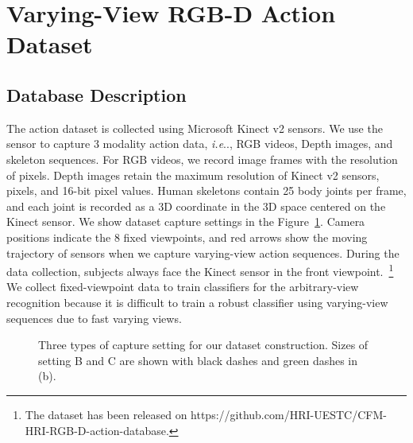 \documentclass[journal]{IEEEtran}
\makeatletter
\DeclareRobustCommand\onedot{\futurelet\@let@token\@onedot}
\def\@onedot{\ifx\@let@token.\else.\null\fi\xspace}
\def\ie{\emph{i.e}\onedot} \def\Ie{\emph{I.e}\onedot}
\makeatother
\begin{document}
\section{Varying-View RGB-D Action Dataset}
\label{sec:dataset}

\subsection{Database Description}
The action dataset is collected using Microsoft Kinect v2 sensors. We use the sensor to capture 3 modality action data, \ie, RGB videos, Depth images, and skeleton sequences. For RGB videos, we record image frames with the resolution of  pixels. Depth images retain the maximum resolution of Kinect v2 sensors,  pixels, and 16-bit pixel values. Human skeletons contain 25 body joints per frame, and each joint is recorded as a 3D coordinate  in the 3D space centered on the Kinect sensor. We show dataset capture settings in the Figure~\ref{fig:captureSet}. Camera positions indicate the 8 fixed viewpoints, and red arrows show the moving trajectory of sensors when we capture varying-view action sequences. During the data collection, subjects always face the Kinect sensor in the front viewpoint.~\footnote{The dataset has been released on  https://github.com/HRI-UESTC/CFM-HRI-RGB-D-action-database.} We collect fixed-viewpoint data to train classifiers for the arbitrary-view recognition because it is difficult to train a robust classifier using varying-view sequences due to fast varying views.

\begin{figure}
 \centering
 \hspace{0.2in}
\caption{Three types of capture setting for our dataset construction. Sizes of setting B and C are shown with black dashes and green dashes in (b).}
 \label{fig:captureSet} \end{figure}
\end{document}
